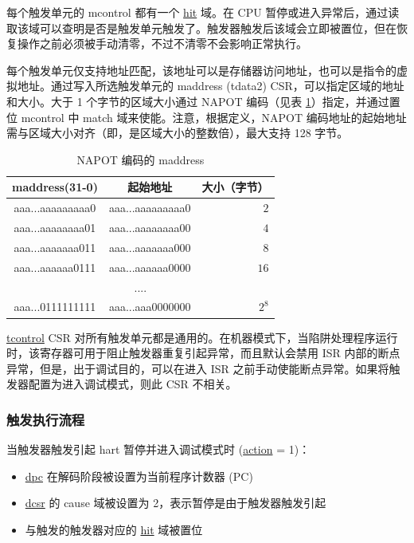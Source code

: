 \documentclass[main\_\_CN.tex]{subfiles}
\begin{document}
每个触发单元的 mcontrol 都有一个 \hyperref[fielddesc:MCONTROLHIT]{hit} 域。在 CPU 暂停或进入异常后，通过读取该域可以查明是否是触发单元触发了。触发器触发后该域会立即被置位，但在恢复操作之前必须被手动清零，不过不清零不会影响正常执行。

每个触发单元仅支持地址匹配，该地址可以是存储器访问地址，也可以是指令的虚拟地址。通过写入所选触发单元的 maddress (tdata2) CSR，可以指定区域的地址和大小。大于 1 个字节的区域大小通过 NAPOT 编码（见表 \ref{tab:riscvcpu-hwt-table}）指定，并通过置位 mcontrol 中 match 域来使能。注意，根据定义，NAPOT 编码地址的起始地址需与区域大小对齐（即，是区域大小的整数倍），最大支持 128 字节。

\begin{longtable}{ | c | c | r | }
\caption{NAPOT 编码的 maddress} \label{tab:riscvcpu-hwt-table}
\\ \hline
\rowcolor{lightgray}
maddress(31-0) & 起始地址 & 大小（字节） \\ \hline
aaa...aaaaaaaaa0 & aaa...aaaaaaaaa0 & $2$ \\ \hline
aaa...aaaaaaaa01 & aaa...aaaaaaaa00 & $4$ \\ \hline
aaa...aaaaaaa011 & aaa...aaaaaaa000 & $8$ \\ \hline
aaa...aaaaaa0111 & aaa...aaaaaa0000 & $16$ \\ \hline
\multicolumn{3}{c}{....} \\ \hline
aaa...0111111111 & aaa...aaa0000000 & $2^{8}$ \\ \hline
\end{longtable}

\hyperref[regdesc:TCONTROL]{tcontrol} CSR 对所有触发单元都是通用的。在机器模式下，当陷阱处理程序运行时，该寄存器可用于阻止触发器重复引起异常，而且默认会禁用 ISR 内部的断点异常，但是，出于调试目的，可以在进入 ISR 之前手动使能断点异常。如果将触发器配置为进入调试模式，则此 CSR 不相关。

\subsubsection{触发执行流程}
\label{sec:riscvcpu-hwt-suggest-op}

当触发器触发引起 hart 暂停并进入调试模式时 (\hyperref[fielddesc:MCONTROLACTION]{action} = 1)：
\begin{itemize}
    \item \hyperref[regdesc:DPC]{dpc} 在解码阶段被设置为当前程序计数器 (PC)
    \item \hyperref[regdesc:DCSR]{dcsr} 的 cause 域被设置为 2，表示暂停是由于触发器触发引起
    \item 与触发的触发器对应的 \hyperref[fielddesc:MCONTROLHIT]{hit} 域被置位
\end{itemize}
\end{document}
